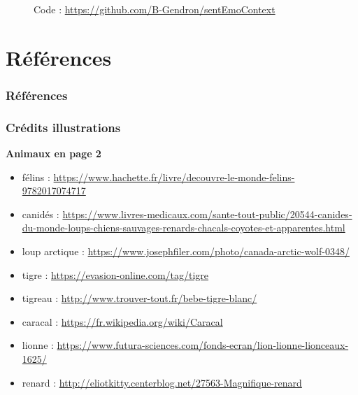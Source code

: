 \documentclass[11pt,aspectratio=169]{beamer}
\begin{document}
\begin{frame}[plain]
\begin{center}
\begin{figure}[h]
\begin{minipage}{0.45\textwidth}
                \caption{\centering Code : \url{https://github.com/B-Gendron/sentEmoContext}}
            \end{minipage}
        \end{figure}
    \end{center}
\end{frame}

\section{Références}

\begin{frame}
\frametitle{Références}
\printbibliography
\end{frame}

\begin{frame}[noframenumbering]
    \frametitle{Crédits illustrations}
    \textbf{Animaux en page 2}
    \begin{itemize}
        \item félins : \url{https://www.hachette.fr/livre/decouvre-le-monde-felins-9782017074717}
        \item canidés : \url{https://www.livres-medicaux.com/sante-tout-public/20544-canides-du-monde-loups-chiens-sauvages-renards-chacals-coyotes-et-apparentes.html}
        \item loup arctique : \url{https://www.josephfiler.com/photo/canada-arctic-wolf-0348/}
        \item tigre : \url{https://evasion-online.com/tag/tigre}
        \item tigreau : \url{http://www.trouver-tout.fr/bebe-tigre-blanc/}
        \item caracal : \url{https://fr.wikipedia.org/wiki/Caracal}
        \item lionne : \url{https://www.futura-sciences.com/fonds-ecran/lion-lionne-lionceaux-1625/}
        \item renard : \url{http://eliotkitty.centerblog.net/27563-Magnifique-renard}
    \end{itemize}
    \end{frame}


\appendix
\end{document}
